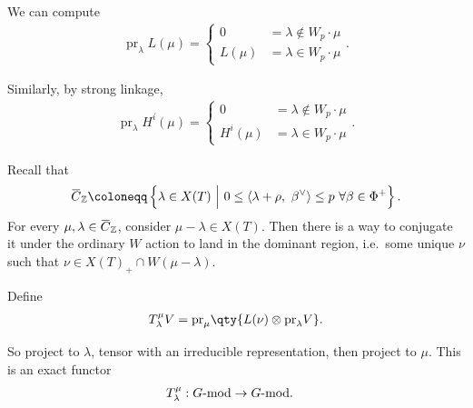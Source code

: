 \begin{example}

We can compute
\begin{align*}  
{\operatorname{pr}}_\lambda L(\mu) = 
\begin{cases}
0 &= \lambda \not\in W_p \cdot \mu \\
L(\mu) &= \lambda \in W_p \cdot \mu
\end{cases}
.\end{align*}

Similarly, by strong linkage,
\begin{align*}  
{\operatorname{pr}}_\lambda H^i(\mu) =
\begin{cases}
0 &= \lambda \not\in W_p \cdot \mu \\
H^i(\mu) &= \lambda \in W_p \cdot \mu
\end{cases}
.\end{align*}

\end{example}

Recall that
\begin{align*}  
\mkern 1.5mu\overline{\mkern-1.5muC\mkern-1.5mu}\mkern 1.5mu_{\mathbb{Z}}\coloneqq\left\{{
\lambda \in X(T) {~\mathrel{\Big|}~}
0 \leq {\left\langle {\lambda + \rho},~{\beta^\vee} \right\rangle} \leq p \,\, \forall \beta\in\Phi^+
}\right\}
.\end{align*}
For every
\(\mu, \lambda \in \mkern 1.5mu\overline{\mkern-1.5muC\mkern-1.5mu}\mkern 1.5mu_{\mathbb{Z}}\),
consider \(\mu - \lambda \in X(T)\). Then there is a way to conjugate it
under the ordinary \(W\) action to land in the dominant region,
i.e.~some unique \(\nu\) such that
\(\nu \in X(T)_+ \cap W(\mu - \lambda)\).

\begin{definition}

Define
\begin{align*}  
T_\lambda^\mu V = 
{\operatorname{pr}}_\mu
\qty{
L(\nu) \otimes
{\operatorname{pr}}_\lambda V
}
.\end{align*}

So project to \(\lambda\), tensor with an irreducible representation,
then project to \(\mu\). This is an exact functor
\begin{align*}  
T_{\lambda}^\mu: G{\hbox{-}}\mathrm{mod} &\to G{\hbox{-}}\mathrm{mod}
.\end{align*}

\end{definition}

